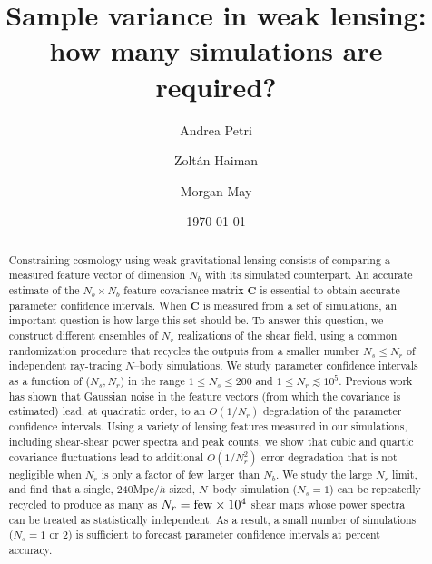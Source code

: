 \documentclass[reprint,aps,prd,superscriptaddress,showkeys,showpacs]{revtex4-1}
\newcommand{\bb}[1]{\mathbf{#1}}
\begin{document}
\title{Sample variance in weak lensing: how many simulations are required?}

\author{Andrea Petri}

\author{Zolt\'an Haiman}

\author{Morgan May}

\date{\today}

\label{firstpage}

\begin{abstract}

Constraining cosmology using weak gravitational lensing consists of
comparing a measured feature vector of dimension $N_b$ with its
simulated counterpart. An accurate estimate of the $N_b\times N_b$
feature covariance matrix $\bb{C}$ is essential to obtain accurate
parameter confidence intervals. When $\bb{C}$ is measured from a set
of simulations, an important question is how large this set should
be. To answer this question, we construct different ensembles of $N_r$
realizations of the shear field, using a common randomization
procedure that recycles the outputs from a smaller number $N_s\leq
N_r$ of independent ray-tracing $N$--body simulations.  We study
parameter confidence intervals as a function of ($N_s,N_r$) in the
range $1\leq N_s\leq 200$ and $1\leq N_r\lesssim 10^5$.  Previous work
\citep{DodelsonSchneider13} has shown that Gaussian noise in the
feature vectors (from which the covariance is estimated) lead, at quadratic order, to an $O(1/N_r)$
degradation of the parameter confidence intervals. Using a variety of
lensing features measured in our simulations, including shear-shear
power spectra and peak counts, we show that cubic and quartic
covariance fluctuations lead to additional $O(1/N_r^2)$ error
degradation that is not negligible when $N_r$ is only a factor of few
larger than $N_b$. We study the large $N_r$ limit, and find that a
single, 240Mpc$/h$ sized, $N$--body simulation ($N_s=1$) can be repeatedly recycled to
produce as many as $N_r={\rm few}\times10^4$ shear maps whose power spectra can be treated as statistically independent. As a result, a small number of simulations ($N_s=1$ or $2$) is sufficient to forecast parameter confidence intervals at percent accuracy. 

\end{abstract}
\end{document}
